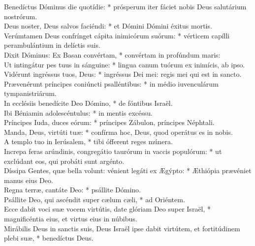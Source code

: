 {	Benedíctus Dóminus die quotídie: * prósperum iter fáciet nobis Deus salutárium nostrórum. \\
	Deus noster, Deus salvos faciéndi: * et Dómini Dómini éxitus mortis. \\
	Verúmtamen Deus confrínget cápita inimicórum suórum: * vérticem capílli perambulántium in delíctis suis. \\
	Dixit Dóminus: Ex Basan convértam, * convértam in profúndum maris: \\
	Ut intingátur pes tuus in sánguine: * lingua canum tuórum ex inimícis, ab ipso. \\
	Vidérunt ingréssus tuos, Deus: * ingréssus Dei mei: regis mei qui est in sancto. \\
	Prævenérunt príncipes coniúncti psalléntibus: * in médio iuvenculárum tympanistriárum. \\
	In ecclésiis benedícite Deo Dómino, * de fóntibus Israël. \\
	Ibi Béniamin adolescéntulus: * in mentis excéssu. \\
	Príncipes Iuda, duces eórum: * príncipes Zábulon, príncipes Néphtali. \\
	Manda, Deus, virtúti tuæ: * confírma hoc, Deus, quod operátus es in nobis. \\
	A templo tuo in Ierúsalem, * tibi ófferent reges múnera. \\
	Increpa feras arúndinis, congregátio taurórum in vaccis populórum: * ut exclúdant eos, qui probáti sunt argénto. \\
	Díssipa Gentes, quæ bella volunt: vénient legáti ex Ægýpto: * Æthiópia prævéniet manus eius Deo. \\
	Regna terræ, cantáte Deo: * psállite Dómino. \\
	Psállite Deo, qui ascéndit super cælum cæli, * ad Oriéntem. \\
	Ecce dabit voci suæ vocem virtútis, date glóriam Deo super Israël, * magnificéntia eius, et virtus eius in núbibus. \\
	Mirábilis Deus in sanctis suis, Deus Israël ipse dabit virtútem, et fortitúdinem plebi suæ, * benedíctus Deus.
}

